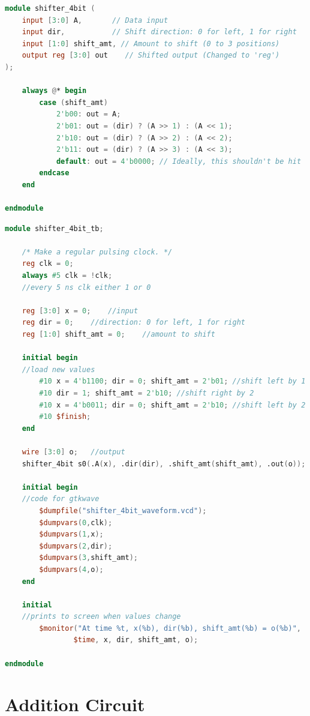 \documentclass[runningheads, 12pt]{report}
\begin{document}
\begin{lstlisting}[language=Verilog, caption={Shifter Circuit Verilog}]
module shifter_4bit (
    input [3:0] A,       // Data input
    input dir,           // Shift direction: 0 for left, 1 for right
    input [1:0] shift_amt, // Amount to shift (0 to 3 positions)
    output reg [3:0] out    // Shifted output (Changed to 'reg')
);

    always @* begin
        case (shift_amt)
            2'b00: out = A;
            2'b01: out = (dir) ? (A >> 1) : (A << 1);
            2'b10: out = (dir) ? (A >> 2) : (A << 2);
            2'b11: out = (dir) ? (A >> 3) : (A << 3);
            default: out = 4'b0000; // Ideally, this shouldn't be hit
        endcase
    end

endmodule
\end{lstlisting}

\begin{lstlisting}[language=Verilog, caption={Shifter Circuit Test Bench}]
module shifter_4bit_tb;

    /* Make a regular pulsing clock. */
    reg clk = 0;
    always #5 clk = !clk;			
    //every 5 ns clk either 1 or 0
    
    reg [3:0] x = 0;	//input
    reg dir = 0;    //direction: 0 for left, 1 for right
    reg [1:0] shift_amt = 0;    //amount to shift

    initial begin				
    //load new values
        #10 x = 4'b1100; dir = 0; shift_amt = 2'b01; //shift left by 1
        #10 dir = 1; shift_amt = 2'b10; //shift right by 2
        #10 x = 4'b0011; dir = 0; shift_amt = 2'b10; //shift left by 2
        #10 $finish;
    end
    
    wire [3:0] o;	//output
    shifter_4bit s0(.A(x), .dir(dir), .shift_amt(shift_amt), .out(o));	//call for shifter module
    
    initial begin				
    //code for gtkwave
        $dumpfile("shifter_4bit_waveform.vcd");
        $dumpvars(0,clk);
        $dumpvars(1,x);
        $dumpvars(2,dir);
        $dumpvars(3,shift_amt);
        $dumpvars(4,o);
    end
    
    initial 				
    //prints to screen when values change
        $monitor("At time %t, x(%b), dir(%b), shift_amt(%b) = o(%b)",  
                $time, x, dir, shift_amt, o);
    
endmodule
\end{lstlisting}


\section{Addition Circuit}
	
\end{document}
